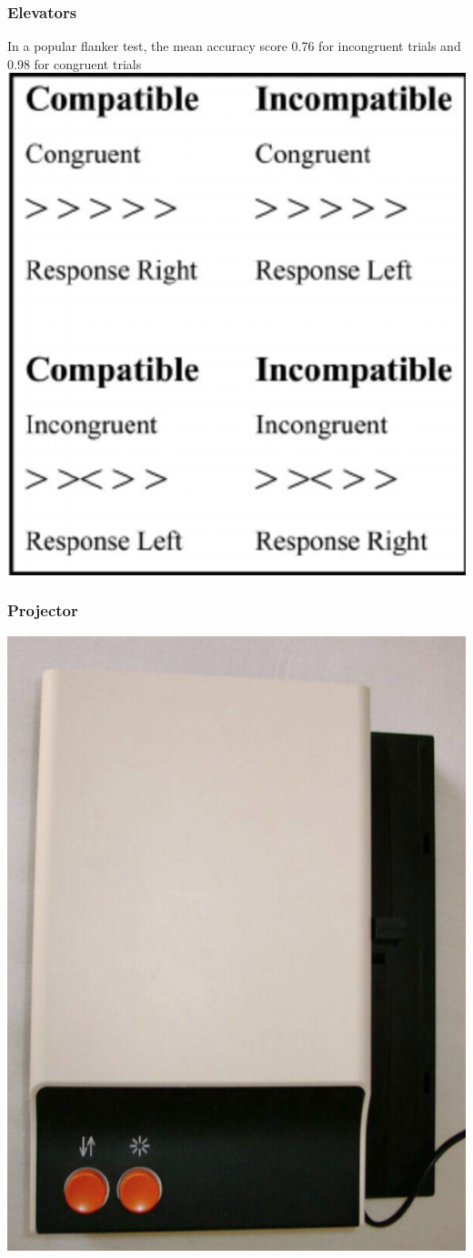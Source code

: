 \documentclass{beamer}
\begin{document}
\begin{frame}
\frametitle{Elevators}
In a popular flanker test, the mean accuracy score 0.76 for incongruent trials and 0.98 for congruent trials
\newline \newline
\centering
\includegraphics[width=.4\linewidth]{flanker}
\end{frame}


\begin{frame}
\frametitle{Projector}
	
\centering
\includegraphics[width=0.45\linewidth]{zeiss}
	
\end{frame}
\end{document}
